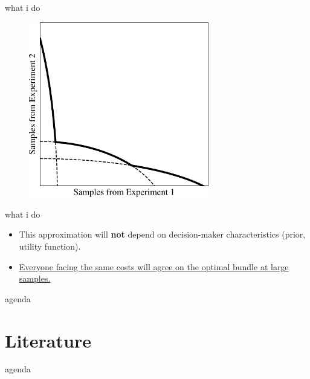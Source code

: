 \documentclass[square,]{gBakerBeamer}
\renewcommand{\|}{\,|\,}
\begin{document}
\begin{frame}{what i do}
  \begin{figure}[h]
    \centering
   \includegraphics[width=0.7\textwidth]{figures/figqualitativepres.pdf}
  \end{figure}
  \note{%

  }
\end{frame}


\begin{frame}{what i do}

  \begin{itemize}
    \item<1-> This approximation will \textbf{not} depend on decision-maker
          characteristics (prior, utility function).\bigskip
    \item<2-> \ul{Everyone facing the same costs will agree on the optimal
          bundle at large samples.}
  \end{itemize}

  \note{
  }
\end{frame}

\begin{frame}{agenda}
  \tableofcontents
\end{frame}



\section{Literature}
\label{sec:literature}

\begin{frame}{agenda}
  \tableofcontents[currentsection]
\end{frame}
\end{document}
